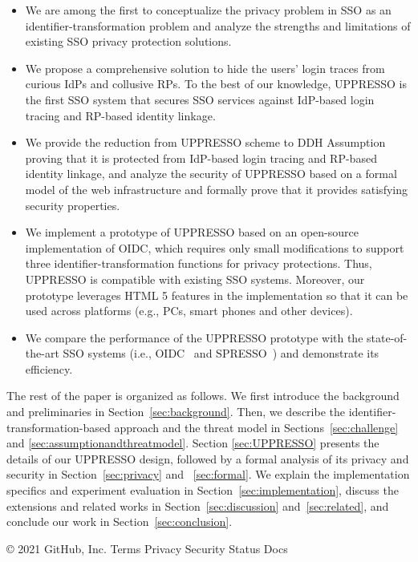 \begin{itemize}
\vspace{-\topsep}
\item We are among the first to conceptualize the privacy problem in SSO as an identifier-transformation problem and analyze the strengths and limitations of existing SSO privacy protection solutions.
\vspace{-\topsep}
\item We propose a comprehensive solution to hide the users' login traces from curious IdPs and collusive RPs. To the best of our knowledge, UPPRESSO is the first SSO system that secures SSO services against IdP-based login tracing and RP-based identity linkage.
\vspace{-\topsep}
\item We provide the reduction from UPPRESSO scheme to DDH Assumption proving that it is protected from IdP-based login tracing and RP-based identity linkage,
and analyze the security of UPPRESSO based on a formal model of the web infrastructure and formally prove that it provides satisfying security properties.
\vspace{-\topsep}
\item We implement a prototype of UPPRESSO based on an open-source implementation of OIDC, which requires only small modifications to support three identifier-transformation functions for privacy protections. Thus, UPPRESSO is compatible with existing SSO systems. Moreover, our prototype leverages HTML 5 features in the implementation so that it can be used across platforms (e.g., PCs, smart phones and other devices). %
\vspace{-\topsep}
\item We compare the performance of the UPPRESSO prototype with the state-of-the-art SSO systems (i.e., OIDC~\cite{OpenIDConnect} and SPRESSO~\cite{SPRESSO}) and demonstrate its efficiency.
\end{itemize}
\vspace{-\topsep}
The rest of the paper is organized as follows. We first introduce the background and preliminaries in Section~\ref{sec:background}. Then, we describe the identifier-transformation-based approach and the threat model in Sections~\ref{sec:challenge} and \ref{sec:assumptionandthreatmodel}. Section \ref{sec:UPPRESSO} presents the details of our UPPRESSO design, followed by a formal analysis of its privacy and security in Section~\ref{sec:privacy} and ~\ref{sec:formal}. We explain the implementation specifics and experiment evaluation in Section~\ref{sec:implementation}, discuss the extensions and related works in Section~\ref{sec:discussion} and~\ref{sec:related}, and conclude our work in Section~\ref{sec:conclusion}.

    © 2021 GitHub, Inc.
    Terms
    Privacy
    Security
    Status
    Docs


